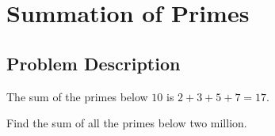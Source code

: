 \chapter{Summation of Primes}
\section{Problem Description}
The sum of the primes below $10$ is $2 + 3 + 5 + 7 = 17$.

Find the sum of all the primes below two million.
